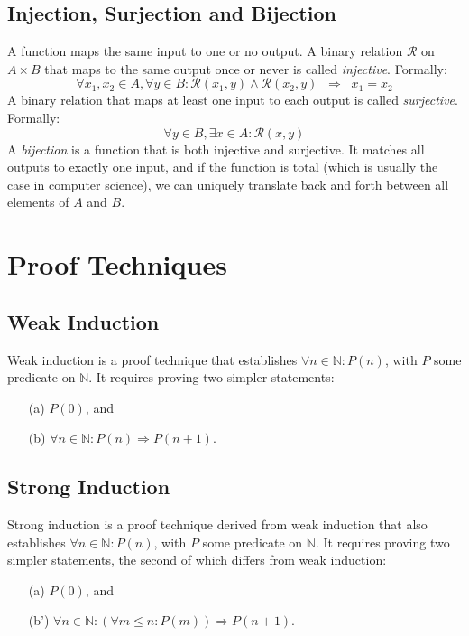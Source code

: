 \subsection*{Injection, Surjection and Bijection}
A function maps the same input to one or no output. A binary relation $\mathcal{R}$ on $A\times B$ that maps to the same output once or never is called \emph{injective}. Formally:
\begin{equation*}
	\forall x_1,x_2\in A, \forall y\in B : \mathcal{R}(x_1,y)  \wedge \mathcal{R}(x_2,y) \;\;\Rightarrow\;\; x_1 = x_2
\end{equation*}
A binary relation that maps at least one input to each output is called \emph{surjective}. Formally:
\begin{equation*}
	\forall y \in B, \exists x\in A : \mathcal{R}(x,y)
\end{equation*}
A \emph{bijection} is a function that is both injective and surjective. It matches all outputs to exactly one input, and if the function is total (which is usually the case in computer science), we can uniquely translate back and forth between all elements of $A$ and $B$.

\section*{Proof Techniques}

\subsection*{Weak Induction}

Weak induction is a proof technique that establishes $\forall n \in \mathbb{N}:
P(n)$, with $P$ some predicate on $\mathbb{N}$.
It requires proving two simpler statements:
\begin{itemize}
	\item[(a)] $P(0)$, and
	\item[(b)] $\forall n \in \mathbb{N}: P(n) \Rightarrow P(n+1)$.
\end{itemize}

\subsection*{Strong Induction}

Strong induction is a proof technique derived from weak induction that also
establishes $\forall n \in \mathbb{N}: P(n)$, with $P$ some
predicate on $\mathbb{N}$. It requires proving two simpler statements, the second
of which differs from weak induction:
\begin{itemize}
	\item[(a)] $P(0)$, and
	\item[(b')] $\forall n \in \mathbb{N}: (\forall m \leq n: P(m)) \Rightarrow P(n+1)$.
\end{itemize}
